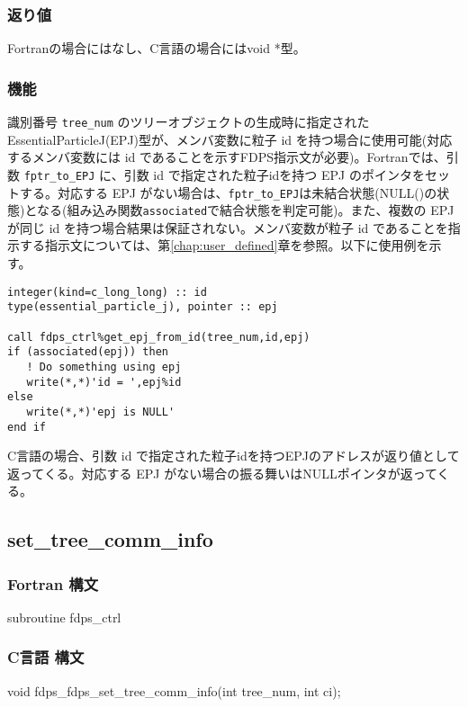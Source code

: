 \subsubsection*{返り値}
Fortranの場合にはなし、C言語の場合にはvoid *型。

\subsubsection*{機能}
識別番号 \texttt{tree\_num} のツリーオブジェクトの生成時に指定されたEssentialParticleJ(EPJ)型が、メンバ変数に粒子 id を持つ場合に使用可能(対応するメンバ変数には id であることを示すFDPS指示文が必要)。Fortranでは、引数 \texttt{fptr\_to\_EPJ} に、引数 id で指定された粒子idを持つ EPJ のポインタをセットする。対応する EPJ がない場合は、\texttt{fptr\_to\_EPJ}は未結合状態(NULL()の状態)となる(組み込み関数\texttt{associated}で結合状態を判定可能)。また、複数の EPJ が同じ id を持つ場合結果は保証されない。メンバ変数が粒子 id であることを指示する指示文については、第\ref{chap:user_defined}章を参照。以下に使用例を示す。
\begin{lstlisting}[caption=例]
integer(kind=c_long_long) :: id
type(essential_particle_j), pointer :: epj

call fdps_ctrl%get_epj_from_id(tree_num,id,epj)
if (associated(epj)) then
   ! Do something using epj
   write(*,*)'id = ',epj%id
else 
   write(*,*)'epj is NULL'
end if
\end{lstlisting}
C言語の場合、引数 id で指定された粒子idを持つEPJのアドレスが返り値として返ってくる。対応する EPJ がない場合の振る舞いはNULLポインタが返ってくる。


\subsection{set\_tree\_comm\_info}
\subsubsection*{Fortran 構文}
\begin{screen}
\begin{spverbatim}
subroutine fdps_ctrl%
\end{spverbatim}
\end{screen}

\subsubsection*{C言語 構文}
\begin{screen}
\begin{spverbatim}
void fdps_fdps_set_tree_comm_info(int tree_num,
                                   int ci);
\end{spverbatim}
\end{screen}




